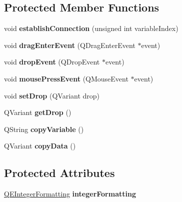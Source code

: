\subsection*{Protected Member Functions}
\begin{DoxyCompactItemize}
\item 
\hypertarget{classQEBitStatus_a63dc4c7eefbcc5241fc1ab4a55ccdd7e}{
void {\bfseries establishConnection} (unsigned int variableIndex)}
\label{classQEBitStatus_a63dc4c7eefbcc5241fc1ab4a55ccdd7e}

\item 
\hypertarget{classQEBitStatus_a0ecf15f006a100a5d7ca3235008899f5}{
void {\bfseries dragEnterEvent} (QDragEnterEvent $\ast$event)}
\label{classQEBitStatus_a0ecf15f006a100a5d7ca3235008899f5}

\item 
\hypertarget{classQEBitStatus_a0f70abeb864ecf5c435d5ad9e13ddd5c}{
void {\bfseries dropEvent} (QDropEvent $\ast$event)}
\label{classQEBitStatus_a0f70abeb864ecf5c435d5ad9e13ddd5c}

\item 
\hypertarget{classQEBitStatus_a6d8248d75de5cc09e17bc46dc339ee98}{
void {\bfseries mousePressEvent} (QMouseEvent $\ast$event)}
\label{classQEBitStatus_a6d8248d75de5cc09e17bc46dc339ee98}

\item 
\hypertarget{classQEBitStatus_afbb3c74dfc85b4464f032c1ddb8242c3}{
void {\bfseries setDrop} (QVariant drop)}
\label{classQEBitStatus_afbb3c74dfc85b4464f032c1ddb8242c3}

\item 
\hypertarget{classQEBitStatus_ad5be0a5af0bb9304380d38924ea74fe7}{
QVariant {\bfseries getDrop} ()}
\label{classQEBitStatus_ad5be0a5af0bb9304380d38924ea74fe7}

\item 
\hypertarget{classQEBitStatus_a1427ad2481cc5097a7ac6445b2c2a315}{
QString {\bfseries copyVariable} ()}
\label{classQEBitStatus_a1427ad2481cc5097a7ac6445b2c2a315}

\item 
\hypertarget{classQEBitStatus_a92bb3a042b0e68fcc54642aa9541b7dd}{
QVariant {\bfseries copyData} ()}
\label{classQEBitStatus_a92bb3a042b0e68fcc54642aa9541b7dd}

\end{DoxyCompactItemize}
\subsection*{Protected Attributes}
\begin{DoxyCompactItemize}
\item 
\hypertarget{classQEBitStatus_a1508c115994f9050b9892227f7d49599}{
\hyperlink{classQEIntegerFormatting}{QEIntegerFormatting} {\bfseries integerFormatting}}
\label{classQEBitStatus_a1508c115994f9050b9892227f7d49599}

\end{DoxyCompactItemize}
